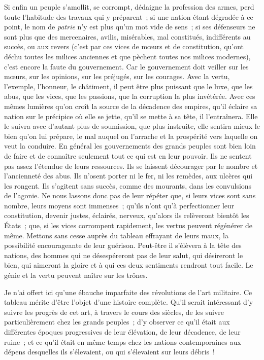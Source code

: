 \documentclass[french,twoside]{book} %
\begin{document}
Si enfin un peuple s’amollit, se corrompt, dédaigne la profession des armes, perd toute l’habitude des travaux qui y préparent ; si une nation étant dégradée à ce point, le nom de {\itshape patrie} n’y est plus qu’un mot vide de sens ; si ses défenseurs ne sont plus que des mercenaires, avilis, misérables, mal constitués, indifférents au succès, ou aux revers (c’est par ces vices de mœurs et de constitution, qu’ont déchu toutes les milices anciennes et que pèchent toutes nos milices modernes), c’est encore la faute du gouvernement. Car le gouvernement doit veiller sur les mœurs, sur les opinions, sur les préjugés, sur les courages. Avec la vertu, l’exemple, l’honneur, le châtiment, il peut être plus puissant que le luxe, que les abus, que les vices, que les passions, que la corruption la plus invétérée. Avec ces mêmes lumières qu’on croît la source de la décadence des empires, qu’il éclaire sa nation sur le précipice où elle se jette, qu’il se mette à sa tête, il l’entraînera. Elle le suivra avec d’autant plus de soumission, que plus instruite, elle sentira mieux le bien qu’on lui prépare, le mal auquel on l’arrache et la prospérité vers laquelle on veut la conduire. En général les gouvernements des grands peuples sont bien loin de faire et de connaître seulement tout ce qui est en leur pouvoir. Ils ne sentent pas assez l’étendue de leurs ressources. Ils se laissent décourager par le nombre et l’ancienneté des abus. Ils n’osent porter ni le fer, ni les remèdes, aux ulcères qui les rongent. Ils s’agitent sans succès, comme des mourants, dans les convulsions de l’agonie. Ne nous lassons donc pas de leur répéter que, si leurs vices sont sans nombre, leurs moyens sont immenses ; qu’ils n’ont qu’à perfectionner leur constitution, devenir justes, éclairés, nerveux, qu’alors ils relèveront bientôt les États ; que, si les vices corrompent rapidement, les vertus peuvent régénérer de même. Mettons sans cesse auprès du tableau effrayant de leurs maux, la possibilité encourageante de leur guérison. Peut-être il s’élèvera à la tête des nations, des hommes qui ne désespéreront pas de leur salut, qui désireront le bien, qui aimeront la gloire et à qui ces deux sentiments rendront tout facile. Le génie et la vertu peuvent naître sur les trônes.\par
Je n’ai offert ici qu’une ébauche imparfaite des révolutions de l’art militaire. Ce tableau mérite d’être l’objet d’une histoire complète. Qu’il serait intéressant d’y suivre les progrès de cet art, à travers le cours des siècles, de les suivre particulièrement chez les grands peuples ; d’y observer ce qu’il était aux différentes époques progressives de leur élévation, de leur décadence, de leur ruine ; et ce qu’il était en même temps chez les nations contemporaines aux dépens desquelles ils s’élevaient, ou qui s’élevaient sur leurs débris !\par
\end{document}
